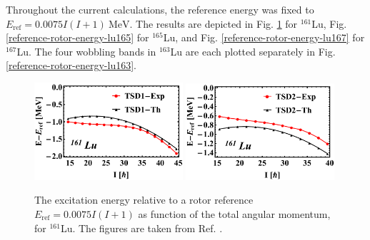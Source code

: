 Throughout the current calculations, the reference energy was fixed to $E_\text{ref}=0.0075I(I+1)\ \text{MeV}$. The results are depicted in Fig. \ref{reference-rotor-energy-lu161} for $^{161}$Lu, Fig. \ref{reference-rotor-energy-lu165} for $^{165}$Lu, and Fig. \ref{reference-rotor-energy-lu167} for $^{167}$Lu. The four wobbling bands in $^{163}$Lu are each plotted separately in Fig. \ref{reference-rotor-energy-lu163}.
\begin{figure}
    \centering
    \includegraphics[width=0.49\textwidth]{Chapters/Figures/Lu-exp-energies/fig11a_lu161.pdf}
    \includegraphics[width=0.49\textwidth]{Chapters/Figures/Lu-exp-energies/fig11b_lu161.pdf}
    \caption{The excitation energy relative to a rotor reference $E_\text{ref}=0.0075I(I+1)$ as function of the total angular momentum, for $^{161}$Lu. The figures are taken from Ref. \cite{raduta2020approach}.}
    \label{reference-rotor-energy-lu161}
\end{figure}
